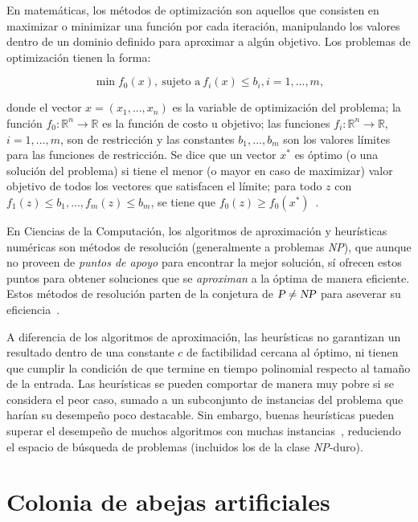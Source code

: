 En matemáticas, los métodos de optimización son aquellos que consisten en
maximizar o minimizar una función por cada iteración, manipulando los valores
dentro de un dominio definido para aproximar a algún objetivo. Los problemas de
optimización tienen la forma:

\begin{displaymath}
  \min f_{0}(x), ~ \textrm{sujeto a} ~ f_{i}(x) \leq b_{i}, i = 1,...,m,
\end{displaymath}

\noindent donde el vector $x=(x_{1},...,x_{n})$ es la variable de optimización
del problema; la función $f_{0}: \mathbb{R}^{n} \rightarrow \mathbb{R}$ es la
función de costo u objetivo; las funciones
$f_{i}: \mathbb{R}^{n} \rightarrow \mathbb{R}$, $i = 1,...,m$, son de
restricción y las constantes $b_{1},...,b_{m}$ son los valores límites para las
funciones de restricción. Se dice que un vector $x^{*}$ es óptimo (o una
solución del problema) si tiene el menor (o mayor en caso de maximizar) valor objetivo de todos los vectores
que satisfacen el límite; para todo $z$ con
$f_{1}(z) \leq b_{1}, ..., f_{m}(z) \leq b_{m}$, se tiene que
$f_{0}(z) \geq f_{0}(x^{*})$~\cite{Boyd:2004:CO:993483}.

En Ciencias de la Computación, los algoritmos de aproximación y heurísticas
numéricas son métodos de resolución (generalmente a problemas \textsl{NP}), que
aunque no proveen de \textit{puntos de apoyo} para encontrar la mejor solución,
sí ofrecen estos puntos para obtener soluciones que se \emph{aproximan} a la
óptima de manera eficiente. Estos métodos de resolución parten de la conjetura
de $\textsl{P} \neq \textsl{NP}$ para aseverar su
eficiencia~\cite{Vazirani:2001:AA:500776}.

A diferencia de los algoritmos de aproximación, las heurísticas no garantizan
un resultado dentro de una constante $c$ de factibilidad cercana al óptimo, ni
tienen que cumplir la condición de que termine en tiempo polinomial respecto
al tamaño de la entrada. Las heurísticas se pueden comportar de manera muy
pobre si se considera el peor caso, sumado a un subconjunto de instancias del
problema que harían su desempeño poco destacable. Sin embargo, buenas
heurísticas pueden superar el desempeño de muchos algoritmos con muchas
instancias~\cite{Ausiello:1999:CAC:554706}, reduciendo el espacio de búsqueda
de problemas (incluidos los de la clase \textsl{NP}-duro).

\section{Colonia de abejas artificiales}

